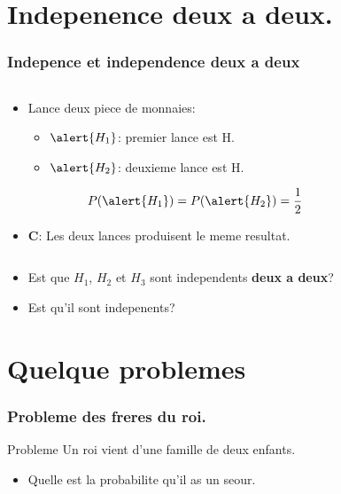 \documentclass{beamer}
\begin{document}
\section{Indepenence deux a deux.}
\begin{frame}[t]
  \frametitle{Indepence et independence deux a deux}

  \begin{columns}
    \begin{column}{0.5\textwidth}
      \begin{itemize}
        \small
        \item Lance deux piece de monnaies:
          \begin{itemize}
            \small
            \item $\alert{H_1}$: premier lance est H.
            \item $\alert{H_2}$: deuxieme lance est H.
          \end{itemize}
          \begin{equation*}
          P(\alert{H_1})=P(\alert{H_2}) =  \frac{1}{2}
          \end{equation*}
          \pause
        \item $\mathbf{C}$: Les deux lances produisent le meme resultat.
      \end{itemize}
    \end{column}
    \begin{column}{0.5\textwidth}
    \end{column}
  \end{columns}
  
  \vspace*{1cm}
  \pause
  \begin{itemize}
    \item Est que $H_1$, $H_2$ et $H_3$ sont independents \textbf{deux a
      deux}?\\[8pt]
    \item Est qu'il sont indepenents?
  \end{itemize}
\end{frame}
\section{Quelque problemes}

\begin{frame}[t]
  \frametitle{Probleme des freres du roi.}
 
  \begin{block}{Probleme}
    Un roi vient d'une famille de deux enfants.\\[4pt]
    \begin{itemize}
      \item Quelle est la probabilite qu'il as un seour.
    \end{itemize}
    
  \end{block}
\end{frame}
\end{document}
